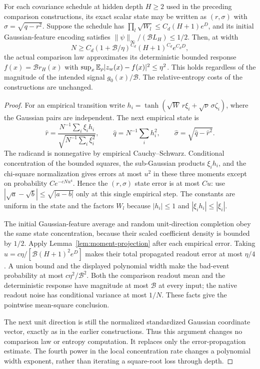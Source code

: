 \begin{lemma}
\label{lem:global-state-propagation}
For each covariance schedule at hidden depth $H\ge2$ used in the preceding comparison constructions, its exact scalar state may be written as $(r,\sigma)$ with $\sigma=\sqrt{q-r^2}$. Suppose the schedule has
$\prod_l\sqrt{W_l}\le C_d(H+1)e^D$, and its initial Gaussian-feature encoding satisfies $\|\psi\|_\infty/(\mathcal B L_H)\le1/2$.
Then, at width
\[
 N\ge C_d(1+\mathcal B/\eta)^{C_d}(H+1)^{C_d}e^{C_dD},
\]
the actual comparison law approximates its deterministic bounded response
$f(x)=\mathcal B r_H(x)$ with
$\sup_x\mathbb E_\rho|z_w(x)-f(x)|^2\le\eta^2$.
This holds regardless of the magnitude of the intended signal $g_0(x)/\mathcal B$. The relative-entropy costs of the constructions are unchanged.
\end{lemma}
\begin{proof}
For an empirical transition write $h_i=\tanh(\sqrt W\,r\xi_i+\sqrt\nu\,\sigma\zeta_i)$, where the Gaussian pairs are independent. The next empirical state is
\[
 \widehat r=\frac{N^{-1}\sum_i\xi_i h_i}
                  {\sqrt{N^{-1}\sum_i\xi_i^2}},\qquad
 \widehat q=N^{-1}\sum_i h_i^2,\qquad
 \widehat\sigma=\sqrt{\widehat q-\widehat r^2}.
\]
The radicand is nonnegative by empirical Cauchy--Schwarz. Conditional concentration of the bounded squares, the sub-Gaussian products $\xi_i h_i$, and the chi-square normalization gives errors at most $u^2$ in these three moments except on probability $Ce^{-cNu^4}$. Hence the $(r,\sigma)$ state error is at most $Cu$: use $|\sqrt a-\sqrt b|\le\sqrt{|a-b|}$ only at this single empirical step. The constants are uniform in the state and the factors $W_l$ because $|h_i|\le1$ and $|\xi_i h_i|\le|\xi_i|$.

The initial Gaussian-feature average and random unit-direction completion obey the same state concentration, because their scaled coefficient density is bounded by $1/2$. Apply Lemma~\ref{lem:moment-projection} after each empirical error. Taking
$u=c\eta/[\mathcal B(H+1)^2e^D]$ makes their total propagated readout error at most $\eta/4$. A union bound and the displayed polynomial width make the bad-event probability at most $c\eta^2/\mathcal B^2$. Both the comparison readout mean and the deterministic response have magnitude at most $\mathcal B$ at every input; the native readout noise has conditional variance at most $1/N$. These facts give the pointwise mean-square conclusion.

The next unit direction is still the normalized standardized Gaussian coordinate vector, exactly as in the earlier constructions. Thus this argument changes no comparison law or entropy computation. It replaces only the error-propagation estimate. The fourth power in the local concentration rate changes a polynomial width exponent, rather than iterating a square-root loss through depth.
\end{proof}

